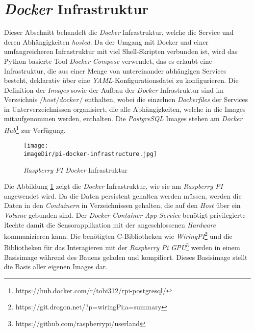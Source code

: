 \section{\emph{Docker} Infrastruktur}
Dieser Abschnitt behandelt die \emph{Docker} Infrastruktur, welche die Service und deren Abhängigkeiten \emph{hosted}. Da der Umgang mit Docker und einer umfangreicheren Infrastruktur mit viel Shell-Skripten verbunden ist, wird das Python basierte Tool \emph{Docker-Compose} verwendet, das es erlaubt eine Infrastruktur, die aus einer Menge von untereinander abhängigen Services besteht, deklarativ über eine \emph{YAML}-Konfigurationsdatei zu konfigurieren. 
\newline
\newline
Die Definition der \emph{Images} sowie der Aufbau der \emph{Docker} Infrastruktur sind im Verzeichnis \emph{$/host/docker/$} enthalten, wobei die einzelnen \emph{Dockerfiles} der Services in Unterverzeichnissen organisiert, die alle Abhängigkeiten, welche in die Images mitaufgenommen werden, enthalten. Die \emph{PostgreSQL} Images stehen am \emph{Docker Hub}\footnote{https://hub.docker.com/r/tobi312/rpi-postgresql/} zur Verfügung.   
\begin{center}
	\begin{figure}[h]
		\centering
		\texttt{[image: \\imageDir/pi-docker-infrastructure.jpg]}
		\caption{\emph{Raspberry PI Docker} Infrastruktur}
		\label{fig:rapsi-docker-infrastructure}
	\end{figure}
\end{center}
Die Abbildung \ref{fig:rapsi-docker-infrastructure} zeigt die \emph{Docker} Infrastruktur, wie sie am \emph{Raspberry PI} angewendet wird. Da die Daten persistent gehalten werden müssen, werden die Daten in den \emph{Containern} in Verzeichnissen gehalten, die auf den \emph{Host} über ein \emph{Volume} gebunden sind. Der \emph{Docker Container App-Service} benötigt privilegierte Rechte damit die Sensorapplikation mit der angeschlossenen \emph{Hardware} kommunizieren kann. Die benötigten C-Bibliotheken wie \emph{WiringPI}\footnote{https://git.drogon.net/?p=wiringPi;a=summary} und die Bibliotheken für das Interagieren mit der \emph{Raspberry Pi GPU}\footnote{https://github.com/raspberrypi/userland} werden in einem Basisimage während des Bauens geladen und kompiliert. Dieses Basisimage stellt die Basis aller eigenen Images dar.
\begin{code}
	\caption{docker-compose.yml für RPISec am \emph{Raspberry PI}}
	\label{src:test-docker-compose}
\end{code}
